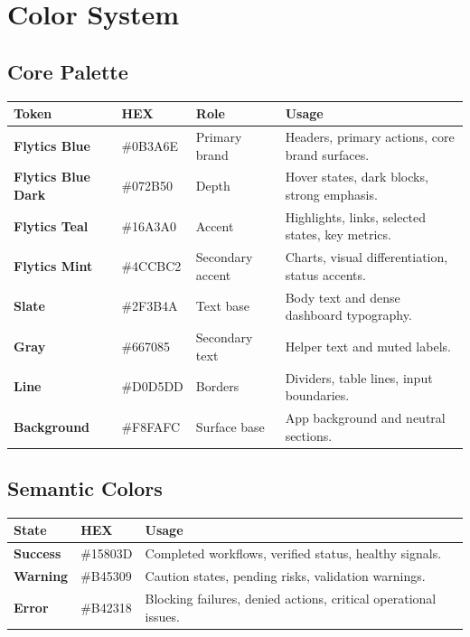\documentclass[11pt,a4paper]{article}
\begin{document}
\section{Color System}

\subsection{Core Palette}

\begin{longtable}{>{\bfseries}p{}p{}p{}p{}}
\toprule
Token & HEX & Role & Usage \\
\midrule
Flytics Blue & \#0B3A6E & Primary brand & Headers, primary actions, core brand surfaces. \\
Flytics Blue Dark & \#072B50 & Depth & Hover states, dark blocks, strong emphasis. \\
Flytics Teal & \#16A3A0 & Accent & Highlights, links, selected states, key metrics. \\
Flytics Mint & \#4CCBC2 & Secondary accent & Charts, visual differentiation, status accents. \\
Slate & \#2F3B4A & Text base & Body text and dense dashboard typography. \\
Gray & \#667085 & Secondary text & Helper text and muted labels. \\
Line & \#D0D5DD & Borders & Dividers, table lines, input boundaries. \\
Background & \#F8FAFC & Surface base & App background and neutral sections. \\
\bottomrule
\end{longtable}

\subsection{Semantic Colors}

\begin{longtable}{>{\bfseries}p{}p{}p{}}
\toprule
State & HEX & Usage \\
\midrule
Success & \#15803D & Completed workflows, verified status, healthy signals. \\
Warning & \#B45309 & Caution states, pending risks, validation warnings. \\
Error & \#B42318 & Blocking failures, denied actions, critical operational issues. \\
\bottomrule
\end{longtable}
\end{document}
